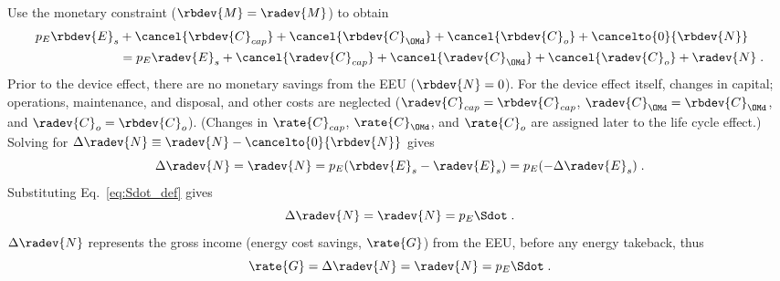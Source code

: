 \begin{landscape}
{Use the monetary constraint ($\rbdev{M} = \radev{M}$) to obtain
%
\begin{align}
  p_E \rbdev{E}_s &+ \cancel{\rbdev{C}_{cap}} + \cancel{\rbdev{C}_{\OMd}} + \cancel{\rbdev{C}_o} + \cancelto{0}{\rbdev{N}} \nonumber \\
                  &= p_E \radev{E}_s + \cancel{\radev{C}_{cap}} + \cancel{\radev{C}_{\OMd}} + \cancel{\radev{C}_o}  + \radev{N} \; .
\end{align}
%
Prior to the device effect, there are no monetary savings from the EEU ($\rbdev{N} = 0$).
For the device effect itself, 
changes in capital; operations, maintenance, and disposal, and other costs are neglected
($\radev{C}_{cap} = \rbdev{C}_{cap}$, $\radev{C}_{\OMd} = \rbdev{C}_{\OMd}$, and $\radev{C}_o = \rbdev{C}_o$).
(Changes in $\rate{C}_{cap}$, $\rate{C}_{\OMd}$, and $\rate{C}_o$ 
are assigned later to the life cycle effect.)
Solving for $\Delta \radev{N} \equiv \radev{N} - \cancelto{0}{\rbdev{N}}$ gives 
%
\begin{equation}
  \Delta \radev{N} = \radev{N} = p_E(\rbdev{E}_s - \radev{E}_s) = p_E (-\Delta \radev{E}_s) \; .
\end{equation}
%
Substituting Eq.~\ref{eq:Sdot_def} gives
%
\begin{equation}
  \Delta \radev{N} = \radev{N} = p_E \Sdot \; .
\end{equation}
%
$\Delta \radev{N}$ represents the gross income (energy cost savings, $\rate{G}$) from the EEU, 
before any energy takeback, thus
%
\begin{equation} \label{eq:G_dot}
  \rate{G} = \Delta \radev{N} = \radev{N} = p_E \Sdot \; .
\end{equation}
}

\end{landscape}
